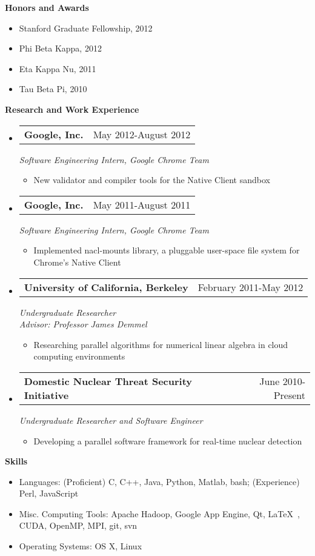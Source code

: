 \documentclass[letterpaper,11pt]{article}
\makeatletter
\newcommand{\resitem}[1]{\item #1 \vspace{-2pt}}
\newcommand{\desitem}[1]{\item #1 \vspace{-7pt}}
\newcommand{\resheading}[1]{{\large \colorbox{mygrey}{\begin{minipage}{\textwidth}{\textbf{#1 \vphantom{p\^{E}}}}\end{minipage}}}}
\newcommand{\expsubheading}[3]{
\begin{tabular*}{7.0in}{l@{\extracolsep{\fill}}r}
		\textbf{#1} & #2 \\
\end{tabular*}
\emph{#3}
\vspace{-6pt}
}
\makeatother
\begin{document}
\resheading{Honors and Awards}
\begin{itemize}
	\desitem{Stanford Graduate Fellowship, 2012}
	\desitem{Phi Beta Kappa, 2012}
	\desitem{Eta Kappa Nu, 2011}
	\desitem{Tau Beta Pi, 2010}
\end{itemize}

\vspace{0.1in}

\resheading{Research and Work Experience}
\begin{itemize}
\item
     \expsubheading{Google, Inc.}{May 2012-August 2012}{Software Engineering Intern, Google Chrome Team}
     \begin{itemize}
         \resitem{New validator and compiler tools for the Native Client sandbox}
     \end{itemize}
     
     \item
     \expsubheading{Google, Inc.}{May 2011-August 2011}{Software Engineering Intern, Google Chrome Team}
     \begin{itemize}
         \resitem{Implemented nacl-mounts library, a pluggable user-space file system for Chrome's Native Client}
     \end{itemize}

\item
   \expsubheading{University of California, Berkeley}{February 2011-May 2012}{Undergraduate Researcher \\
   Advisor: Professor James Demmel}
    \begin{itemize}
             \resitem{Researching parallel algorithms for numerical linear algebra in cloud computing environments}
     \end{itemize}
     
\item
    \expsubheading{Domestic Nuclear Threat Security Initiative}{June 2010-Present}{Undergraduate Researcher and Software Engineer}
    \begin{itemize}
         \resitem{Developing a parallel software framework for real-time nuclear detection}
     \end{itemize}    
     
\end{itemize}

\vspace{0.1in}

\resheading{Skills}
\begin{itemize}
    \desitem{Languages:
                    (Proficient) C, C++, Java, Python, Matlab, bash; (Experience) Perl, JavaScript}
    \desitem{Misc. Computing Tools:
                     Apache Hadoop, Google App Engine, Qt, \LaTeX\ , CUDA, OpenMP, MPI, git, svn}
    \desitem{Operating Systems:
                     OS X, Linux}
\end{itemize}
\end{document}
